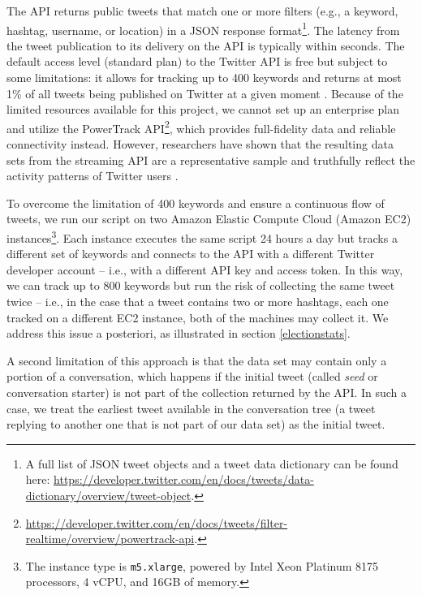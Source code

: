 The API returns public tweets that match one or more filters (e.g., a keyword, hashtag, username, or location) in a JSON response format\footnote{A full list of JSON tweet objects and a tweet data dictionary can be found here: \url{https://developer.twitter.com/en/docs/tweets/data-dictionary/overview/tweet-object}.}. The latency from the tweet publication to its delivery on the API is typically within seconds. The default access level (standard plan) to the Twitter API is free but subject to some limitations: it allows for tracking up to 400 keywords and returns at most 1\% of all tweets being published on Twitter at a given moment \citep{morstatter:2014}. Because of the limited resources available for this project, we cannot set up an enterprise plan and utilize the PowerTrack API\footnote{\url{https://developer.twitter.com/en/docs/tweets/filter-realtime/overview/powertrack-api}.}, which provides full-fidelity data and reliable connectivity instead. However, researchers have shown that the resulting data sets from the streaming API are a representative sample and truthfully reflect the activity patterns of Twitter users \citep{morstatter:2013, morstatter:2014, wang:2015}.

To overcome the limitation of 400 keywords and ensure a continuous flow of tweets, we run our script on two Amazon Elastic Compute Cloud (Amazon EC2) instances\footnote{The instance type is \texttt{m5.xlarge}, powered by Intel Xeon Platinum 8175 processors, 4 vCPU, and 16GB of memory.}. Each instance executes the same script 24 hours a day but tracks a different set of keywords and connects to the API with a different Twitter developer account – i.e., with a different API key and access token. In this way, we can track up to 800 keywords but run the risk of collecting the same tweet twice – i.e., in the case that a tweet contains two or more hashtags, each one tracked on a different EC2 instance, both of the machines may collect it. We address this issue a posteriori, as illustrated in section \vref{electionstats}.

A second limitation of this approach is that the data set may contain only a portion of a conversation, which happens if the initial tweet (called \textit{seed} or conversation starter) is not part of the collection returned by the API. In such a case, we treat the earliest tweet available in the conversation tree (a tweet replying to another one that is not part of our data set) as the initial tweet.

